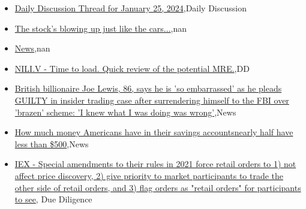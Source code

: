 \documentclass{article}%
\begin{document}
%
\begin{itemize}%
\item%
\href{https://reddit.com/r/wallstreetbets/comments/19f6sw5/daily\_discussion\_thread\_for\_january\_25\_2024/}{Daily Discussion Thread for January 25, 2024},Daily Discussion%
\item%
\href{https://reddit.com/r/wallstreetbets/comments/19f5i3c/the\_stocks\_blowing\_up\_just\_like\_the\_cars\_tesla/}{The stock's blowing up just like the cars...},nan%
\item%
\href{XGramatik}{News},nan%
\item%
\href{https://reddit.com/r/Baystreetbets/comments/19eu9bl/niliv\_time\_to\_load\_quick\_review\_of\_the\_potential/}{NILI.V - Time to load. Quick review of the potential MRE.},DD%
\item%
\href{https://reddit.com/r/StockMarket/comments/19f2c1l/british\_billionaire\_joe\_lewis\_86\_says\_he\_is\_so/}{British billionaire Joe Lewis, 86, says he is 'so embarrassed' as he pleads GUILTY in insider trading case after surrendering himself to the FBI over 'brazen' scheme: 'I knew what I was doing was wrong'},News%
\item%
\href{https://reddit.com/r/Economics/comments/19f6hh5/how\_much\_money\_americans\_have\_in\_their\_savings/}{How much money Americans have in their savings accountsnearly half have less than \$500},News%
\item%
\href{https://reddit.com/r/Superstonk/comments/19ey1ox/iex\_special\_amendments\_to\_their\_rules\_in\_2021/}{IEX - Special amendments to their rules in 2021 force retail orders to 1) not affect price discovery, 2) give priority to market participants to trade the other side of retail orders, and 3) flag orders as "retail orders" for participants to see}, Due Diligence%
\end{itemize}%
\end{document}
